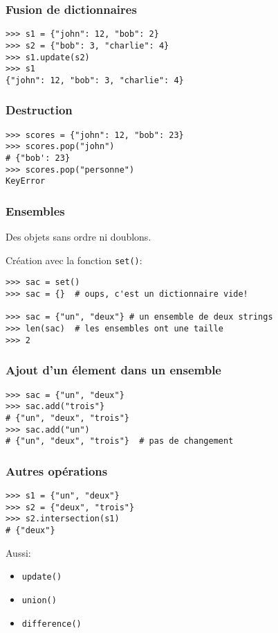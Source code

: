 \documentclass{beamer}
\begin{document}
\begin{frame}[fragile]
  \frametitle{Fusion de dictionnaires}

\begin{lstlisting}
>>> s1 = {"john": 12, "bob": 2}
>>> s2 = {"bob": 3, "charlie": 4}
>>> s1.update(s2)
>>> s1
{"john": 12, "bob": 3, "charlie": 4}
\end{lstlisting}
\end{frame}


\begin{frame}[fragile]
  \frametitle{Destruction}

\begin{lstlisting}
>>> scores = {"john": 12, "bob": 23}
>>> scores.pop("john")
# {"bob': 23}
>>> scores.pop("personne")
KeyError
\end{lstlisting}

\end{frame}

\begin{frame}[fragile]
  \frametitle{Ensembles}
Des objets sans ordre ni doublons.

Création avec la fonction \texttt{set()}:

\begin{lstlisting}
>>> sac = set()
>>> sac = {}  # oups, c'est un dictionnaire vide!

>>> sac = {"un", "deux"} # un ensemble de deux strings
>>> len(sac)  # les ensembles ont une taille
>>> 2
\end{lstlisting}
\end{frame}

\begin{frame}[fragile]
  \frametitle{Ajout d'un élement dans un ensemble}
\begin{lstlisting}
>>> sac = {"un", "deux"}
>>> sac.add("trois"}
# {"un", "deux", "trois"}
>>> sac.add("un")
# {"un", "deux", "trois"}  # pas de changement
\end{lstlisting}
\end{frame}

\begin{frame}[fragile]
  \frametitle{Autres opérations}
\begin{lstlisting}
>>> s1 = {"un", "deux"}
>>> s2 = {"deux", "trois"}
>>> s2.intersection(s1)
# {"deux"}
\end{lstlisting}

Aussi:

\begin{itemize}
  \item \texttt{update()}
  \item \texttt{union()}
  \item \texttt{difference()}
\end{itemize}
\end{frame}
\end{document}
